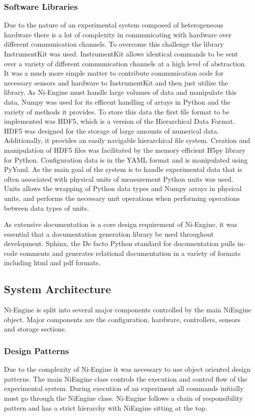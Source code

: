 \subsubsection{Software Libraries}
Due to the nature of an experimental system composed of heterogeneous hardware there is a lot of complexity in communicating with hardware over different communication channels. To overcome this challenge the library  InstrumentKit\cite{instrumentKit} was used. InstrumentKit allows identical commands to be sent over a variety of different communication channels at a high level of abstraction. It was a much more simple matter to contribute communication code for necessary sensors and hardware to InstrumentKit and then just utilize the library. As Ni-Engine must handle large volumes of data and manipulate this data, Numpy\cite{numpy} was used for its efficent handling of arrays in Python and the variety of methods it provides. To store this data the first file format to be implemented was HDF5\cite{hdf5}, which is a version of the Hierarchical Data Format. HDF5 was designed for the storage of large amounts of numerical data. Additionally, it provides an easily navigable hierarchical file system. Creation and manipulation of HDF5 files was facilitated by the memory efficient H5py\cite{h5py} library for Python. Configuration data is in the YAML\cite{yaml} format and is manipulated using PyYaml\cite{pyyaml}. As the main goal of the system is to handle experimental data that is often associated with physical units of measurement Python units\cite{units} was used. Units allows the wrapping of Python data types and Numpy arrays in physical units, and performs the necessary unit operations when performing operations between data types of units. 

As extensive documentation is a core design requirement of Ni-Engine, it was essential that a documentation generation library be used throughout development. Sphinx\cite{sphinx}, the De facto Python standard for documentation pulls in-code comments and generates relational documentation in a variety of formats including html and pdf formats. 
\subsection{System Architecture}
Ni-Engine is split into several major components controlled by the main NiEngine object. Major components are the configuration, hardware, controllers, sensors and storage sections. 
\subsubsection{Design Patterns}
Due to the complexity of Ni-Engine it was necessary to use object oriented design patterns. The main NiEngine class controls the execution and control flow of the experimental system. During execution of an experiment all commands initially must go through the NiEngine class. Ni-Engine follows a chain of responsibility pattern and has a strict hierarchy with NiEngine sitting at the top.


